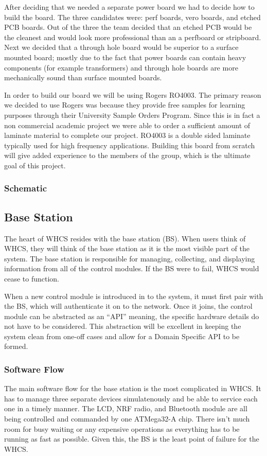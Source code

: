 After deciding that we needed a separate power board we had to decide how to
build the board. The three candidates were: perf boards, vero boards, and
etched PCB boards. Out of the three the team decided that an etched PCB would
be the cleanest and would look more professional than an a perfboard or
stripboard. Next we decided that a through hole board would be superior to a
surface mounted board; mostly due to the fact that power boards can contain
heavy components (for example transformers) and through hole boards are more
mechanically sound than surface mounted boards.

In order to build our board we will be using Rogers RO4003. The primary reason
we decided to use Rogers was because they provide free samples for learning
purposes through their University Sample Orders Program. Since this is in fact
a non commercial academic project we were able to order a sufficient amount of
laminate material to complete our project.  RO4003 is a double sided laminate
typically used for high frequency applications. Building this board from
scratch will give added experience to the members of the group, which is the
ultimate goal of this project.

\subsubsection{Schematic}


\subsection{Base Station}
The heart of WHCS resides with the base station (BS). When users think of WHCS, they
will think of the base station as it is the most visible part of the system.
The base station is responsible for managing, collecting, and displaying
information from all of the control modules. If the BS were to fail, WHCS
would cease to function.

When a new control module is introduced in to the system, it must first pair
with the BS, which will authenticate it on to the network. Once it joins, the
control module can be abstracted as an ``API'' meaning, the specific hardware
details do not have to be considered. This abstraction will be excellent in
keeping the system clean from one-off cases and allow for a Domain Specific API
to be formed.

\subsubsection{Software Flow}
The main software flow for the base station is the most complicated in WHCS. It
has to manage three separate devices simulatenously and be able to service each
one in a timely manner. The LCD, NRF radio, and Bluetooth module are all being
controlled and commanded by one ATMega32-A chip. There isn't much room for busy
waiting or any expensive operations as everything has to be running as fast as
possible. Given this, the BS is the least point of failure for the WHCS.

